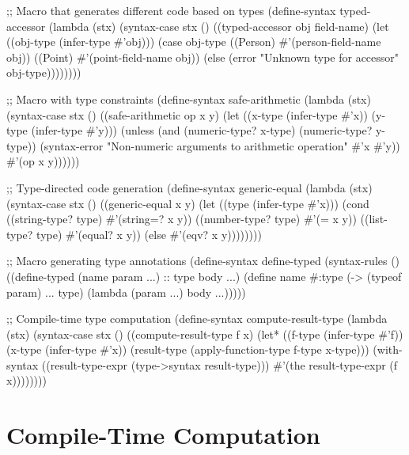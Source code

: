 \begin{example}
\begin{lambdustcode}
;; Macro that generates different code based on types
(define-syntax typed-accessor
  (lambda (stx)
    (syntax-case stx ()
      ((typed-accessor obj field-name)
       (let ((obj-type (infer-type #'obj)))
         (case obj-type
           ((Person) #'(person-field-name obj))
           ((Point) #'(point-field-name obj))  
           (else (error "Unknown type for accessor" obj-type))))))))

;; Macro with type constraints
(define-syntax safe-arithmetic
  (lambda (stx)
    (syntax-case stx ()
      ((safe-arithmetic op x y)
       (let ((x-type (infer-type #'x))
             (y-type (infer-type #'y)))
         (unless (and (numeric-type? x-type) (numeric-type? y-type))
           (syntax-error "Non-numeric arguments to arithmetic operation"
                        #'x #'y))
         #'(op x y))))))

;; Type-directed code generation
(define-syntax generic-equal
  (lambda (stx)
    (syntax-case stx ()
      ((generic-equal x y)
       (let ((type (infer-type #'x)))
         (cond
           ((string-type? type) #'(string=? x y))
           ((number-type? type) #'(= x y))
           ((list-type? type) #'(equal? x y))
           (else #'(eqv? x y))))))))

;; Macro generating type annotations
(define-syntax define-typed
  (syntax-rules ()
    ((define-typed (name param ...) :: type body ...)
     (define name 
       #:type (-> (typeof param) ... type)
       (lambda (param ...) body ...)))))

;; Compile-time type computation
(define-syntax compute-result-type
  (lambda (stx)
    (syntax-case stx ()
      ((compute-result-type f x)
       (let* ((f-type (infer-type #'f))
              (x-type (infer-type #'x))
              (result-type (apply-function-type f-type x-type)))
         (with-syntax ((result-type-expr (type->syntax result-type)))
           #'(the result-type-expr (f x))))))))
\end{lambdustcode}
\end{example}

\section{Compile-Time Computation}
\label{sec:compile-time-computation}


